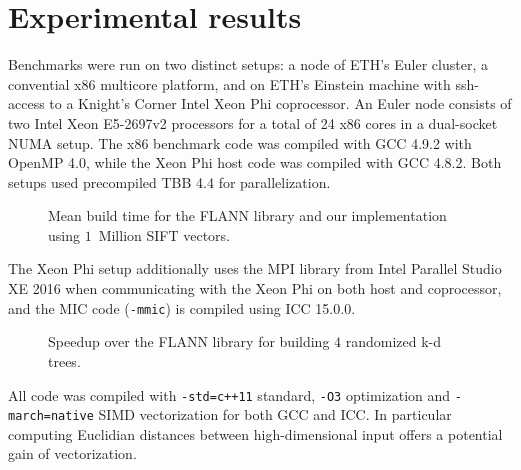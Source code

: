 \section{Experimental results}\sloppy
  \label{sec:exp}


  Benchmarks were run on two distinct setups: a node of ETH's Euler cluster, 
  a convential x86 multicore platform, and on ETH's Einstein machine with 
  ssh-access to a Knight's Corner Intel Xeon Phi coprocessor. An Euler node 
  consists of two Intel Xeon E5-2697v2 processors for a total of 24 x86 cores 
  in a dual-socket NUMA setup. The x86 benchmark code was compiled with GCC 
  4.9.2 with OpenMP 4.0, while the Xeon Phi host code was compiled with GCC 
  4.8.2. Both setups used precompiled TBB 4.4 for parallelization.
  \begin{figure}[tb]
    \centering
    \resizebox{\columnwidth}{!}{}
    \caption{Mean build time for the FLANN library and our implementation using 
    $1$~Million SIFT vectors.}
    \label{fig:build_comparison}
  \end{figure}
  The Xeon Phi setup additionally uses the MPI library from Intel Parallel 
  Studio XE 2016 when communicating with the Xeon Phi on both host and 
  coprocessor, and the MIC code (\texttt{-mmic}) is compiled using ICC 15.0.0.  
  \begin{figure}[tb]
    \centering
    \resizebox{\columnwidth}{!}{}
    \caption{Speedup over the FLANN library for building $4$ randomized k-d 
    trees.}
    \label{fig:build_speedup}
  \end{figure}
  All code was compiled with \texttt{-std=c++11} standard, \texttt{-O3} 
  optimization and \texttt{-march=native} SIMD vectorization for both GCC and 
  ICC. In particular computing Euclidian distances between high-dimensional 
  input offers a potential gain of
  vectorization. 

